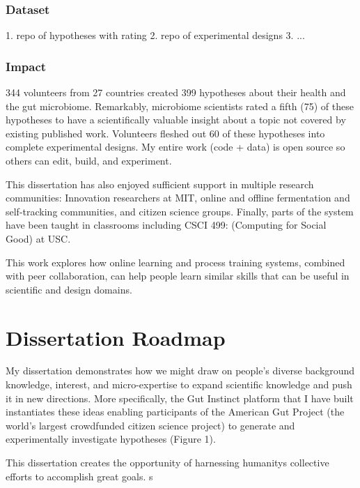 \subsubsection{Dataset}
1. repo of hypotheses with rating
2. repo of experimental designs
3. ...

\subsubsection{Impact}
344 volunteers from 27 countries created 399 hypotheses about their health and the gut microbiome. Remarkably, microbiome scientists rated a fifth (75) of these hypotheses to have a scientifically valuable insight about a topic not covered by existing published work. Volunteers fleshed out 60 of these hypotheses into complete experimental designs. My entire work (code + data) is open source so others can edit, build, and experiment.

This dissertation has also enjoyed sufficient support in multiple research communities: Innovation researchers at MIT, online and offline fermentation and self-tracking communities, and citizen science groups. Finally, parts of the system have been taught in classrooms including CSCI 499: (Computing for Social Good) at USC. 

This work explores how online learning and process training systems, combined with
peer collaboration, can help people learn similar skills that
can be useful in scientific and design domains.


\section{Dissertation Roadmap}


My dissertation demonstrates how we might draw on people’s diverse background knowledge, interest, and micro-expertise to expand scientific knowledge and push it in new directions. More specifically, the Gut Instinct platform that I have built instantiates these ideas enabling participants of the American Gut Project (the world’s largest crowdfunded citizen science project) to generate and experimentally investigate hypotheses (Figure 1). 

This dissertation creates the opportunity of harnessing humanity\textquotesingle s collective efforts to accomplish great goals.
s


